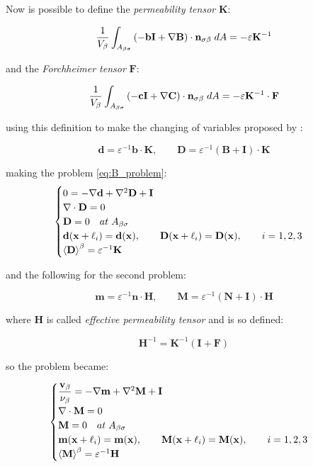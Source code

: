 Now is possible to define the \textit{permeability tensor} $\mathbf{K}$:

$$
 \dfrac{1}{V_\beta} \int_{A_{\beta \sigma}}  \left(-\mathbf{b}\mathbf{I}  +  \nabla \mathbf{B} \right) \cdot \mathbf{n}_{\sigma \beta} \;dA = -\varepsilon \mathbf{K}^{-1}
$$

and the \textit{Forchheimer tensor} $\mathbf{F}$:

$$
\dfrac{1}{V_\beta} \int_{A_{\beta \sigma}} \left(-\mathbf{c}\mathbf{I}  +  \nabla \mathbf{C} \right) \cdot \mathbf{n}_{\sigma \beta} \;dA = -\varepsilon \mathbf{K}^{-1} \cdot \mathbf{F}
$$

using this definition to make the changing of variables proposed by \citet{barrere1992closure}:

$$
\mathbf{d} = \varepsilon^{-1} \mathbf{b} \cdot \mathbf{K}, \qquad \mathbf{D} = \varepsilon^{-1} \left(\mathbf{B} + \mathbf{I} \right)\cdot \mathbf{K}
$$

making the problem \eqref{eq:B_problem}:
\begin{eqnarray}
	\begin{cases}
		0 = -\nabla \mathbf{d} + \nabla^2 \mathbf{D} +\mathbf{I}\\
		\nabla \cdot \mathbf{D} = 0  \\
		\mathbf{D} = 0 \quad at \; A_{\beta \sigma} \\
		\mathbf{d}(\mathbf{x} +\ell_i) = \mathbf{d}(\mathbf{x}), \qquad \mathbf{D}(\mathbf{x} +\ell_i) = \mathbf{D}(\mathbf{x}), \qquad i=1,2,3 \\
		{\left< \mathbf{D} \right>}^{\beta} = \varepsilon^{-1} \mathbf{K}
	\end{cases}
\label{eq:D_problem}
\end{eqnarray}

and the following for the second problem:

$$
\mathbf{m} = \varepsilon^{-1} \mathbf{n} \cdot \mathbf{H}, \qquad \mathbf{M} = \varepsilon^{-1} \left(\mathbf{N} + \mathbf{I} \right)\cdot \mathbf{H}
$$

where $\mathbf{H}$ is called \textit{effective permeability tensor} and is so defined:

$$
\mathbf{H}^{-1} = \mathbf{K}^{-1} \left(\mathbf{I} +\mathbf{F}\right)
$$

so the problem became:

\begin{eqnarray}
	\begin{cases}
		\dfrac{\textbf{v}_{\beta}}{\nu_{\beta}} = -\nabla \mathbf{m} + \nabla^2 \mathbf{M} +\mathbf{I}\\
		\nabla \cdot \mathbf{M} = 0  \\
		\mathbf{M} = 0 \quad at \; A_{\beta \sigma} \\
		\mathbf{m}(\mathbf{x} +\ell_i) = \mathbf{m}(\mathbf{x}), \qquad \mathbf{M}(\mathbf{x} +\ell_i) = \mathbf{M}(\mathbf{x}), \qquad i=1,2,3 \\
		{\left< \mathbf{M} \right>}^{\beta} = \varepsilon^{-1} \mathbf{H}
	\end{cases}
\label{eq:M_problem}
\end{eqnarray}

